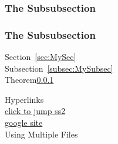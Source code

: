 \documentclass{article}
\begin{document}
    \subsubsection{The Subsubsection}\label{ss1}
    \subsubsection{The Subsubsection}\label{ss2}

    Section~\ref{sec:MySec}\\
    Subsection~\ref{subsec:MySubsec}\\
    Theorem\ref{ss1}\\

    \newpage

    {\Large Hyperlinks}\\[15pt]
    \hyperlink{ss2}{click to jump ss2}\\[10pt]
    \href{http://google.com}{google site}\\


    {\Large Using Multiple Files}
\end{document}
